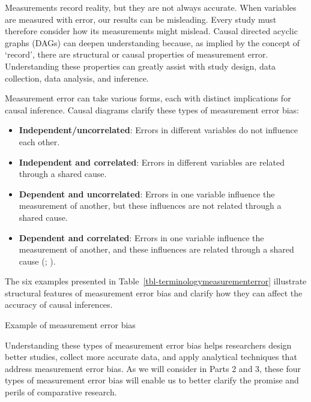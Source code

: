 \documentclass[
  single column]{article}
\providecommand{\tightlist}{%
  \setlength{\itemsep}{0pt}\setlength{\parskip}{0pt}}\usepackage{longtable,booktabs,array}
\begin{document}
Measurements record reality, but they are not always accurate. When
variables are measured with error, our results can be misleading. Every
study must therefore consider how its measurements might mislead. Causal
directed acyclic graphs (DAGs) can deepen understanding because, as
implied by the concept of `record', there are structural or causal
properties of measurement error. Understanding these properties can
greatly assist with study design, data collection, data analysis, and
inference.

Measurement error can take various forms, each with distinct
implications for causal inference. Causal diagrams clarify these types
of measurement error bias:

\begin{itemize}
\tightlist
\item
  \textbf{Independent/uncorrelated}: Errors in different variables do
  not influence each other.
\item
  \textbf{Independent and correlated}: Errors in different variables are
  related through a shared cause.
\item
  \textbf{Dependent and uncorrelated}: Errors in one variable influence
  the measurement of another, but these influences are not related
  through a shared cause.
\item
  \textbf{Dependent and correlated}: Errors in one variable influence
  the measurement of another, and these influences are related through a
  shared cause (;
  ).
\end{itemize}

The six examples presented in
Table~\ref{tbl-terminologymeasurementerror} illustrate structural
features of measurement error bias and clarify how they can affect the
accuracy of causal inferences.

\begin{table}

\caption{\label{tbl-terminologymeasurementerror}Example of measurement
error bias}

\centering{

\terminologymeasurementerror

}

\end{table}%

Understanding these types of measurement error bias helps researchers
design better studies, collect more accurate data, and apply analytical
techniques that address measurement error bias. As we will consider in
Parts 2 and 3, these four types of measurement error bias will enable us
to better clarify the promise and perils of comparative research.
\end{document}
